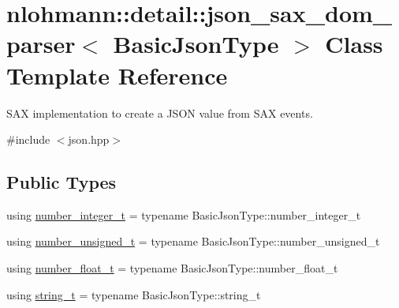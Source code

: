 \hypertarget{classnlohmann_1_1detail_1_1json__sax__dom__parser}{}\section{nlohmann\+::detail\+::json\+\_\+sax\+\_\+dom\+\_\+parser$<$ Basic\+Json\+Type $>$ Class Template Reference}
\label{classnlohmann_1_1detail_1_1json__sax__dom__parser}


S\+AX implementation to create a J\+S\+ON value from S\+AX events.  




{\ttfamily \#include $<$json.\+hpp$>$}

\subsection*{Public Types}
\begin{DoxyCompactItemize}
\item 
using \mbox{\hyperlink{classnlohmann_1_1detail_1_1json__sax__dom__parser_a3d5cd67d179aa7422ce90e54984a441e}{number\+\_\+integer\+\_\+t}} = typename Basic\+Json\+Type\+::number\+\_\+integer\+\_\+t
\item 
using \mbox{\hyperlink{classnlohmann_1_1detail_1_1json__sax__dom__parser_a90f19b272530a479db81db11be2ea15c}{number\+\_\+unsigned\+\_\+t}} = typename Basic\+Json\+Type\+::number\+\_\+unsigned\+\_\+t
\item 
using \mbox{\hyperlink{classnlohmann_1_1detail_1_1json__sax__dom__parser_ad8da3aad0147b18b3cb76868480300fe}{number\+\_\+float\+\_\+t}} = typename Basic\+Json\+Type\+::number\+\_\+float\+\_\+t
\item 
using \mbox{\hyperlink{classnlohmann_1_1detail_1_1json__sax__dom__parser_afd4d961ab2a6b01cbe6e840f7fb90cdc}{string\+\_\+t}} = typename Basic\+Json\+Type\+::string\+\_\+t
\end{DoxyCompactItemize}
